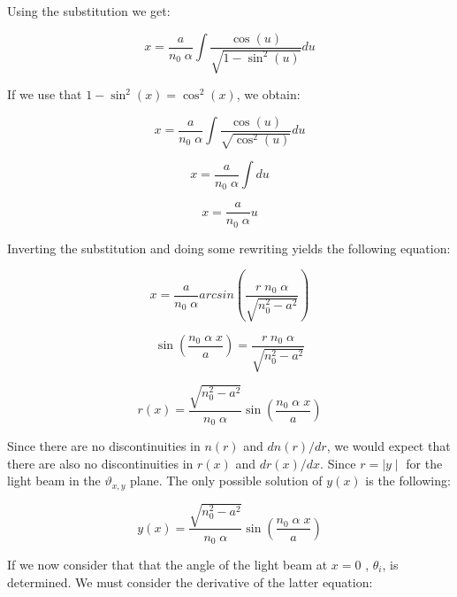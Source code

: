 \documentclass{article}
\begin{document}
Using the substitution we get:

\begin{equation*}
	x = \frac{a}{n_0 \; \alpha} \int \frac{\cos (u)}{\sqrt{1 - \sin^2 (u)}} du
\end{equation*}

If we use that $1 - \sin^2 (x) = \cos^2 (x)$, we obtain:

\begin{equation*}
	x = \frac{a}{n_0 \; \alpha} \int \frac{\cos (u)}{\sqrt{\cos^2 (u)}} du
\end{equation*}

\begin{equation*}
	x = \frac{a}{n_0 \; \alpha} \int du
\end{equation*}

\begin{equation*}
	x = \frac{a}{n_0 \; \alpha} u
\end{equation*}

Inverting the substitution and doing some rewriting yields the following equation:

\begin{equation*}
	x = \frac{a}{n_0 \; \alpha} arcsin \left( \frac{r \; n_0 \; \alpha}{\sqrt{n_0^2-a^2}} \right)
\end{equation*}

\begin{equation*}
	\sin \left( \frac{n_0 \; \alpha \; x}{a} \right) =  \frac{r \; n_0 \; \alpha}{\sqrt{n_0^2-a^2}}
\end{equation*}

\begin{equation*}
	r(x) = \frac{\sqrt{n_0^2-a^2}}{n_0 \; \alpha} \sin \left( \frac{n_0 \; \alpha \; x}{a} \right)
\end{equation*}

Since there are no discontinuities in $n(r)$ and $dn(r)/dr$, we would expect that there are also no discontinuities in $r(x)$ and $dr(x)/dx$. Since $r = \mid y \mid$ for the light beam in the $\vartheta _{x,y}$ plane. The only possible solution of $y(x)$ is the following:

\begin{equation}
	y(x) = \frac{\sqrt{n_0^2-a^2}}{n_0 \;\alpha} \sin \left( \frac{n_0 \; \alpha \; x}{a}\right)
	\label{eq_fibre_path}
\end{equation}

If we now consider that that the angle of the light beam at $x=0$ , $\theta _i$, is determined. We must consider the derivative of the latter equation:
\end{document}
